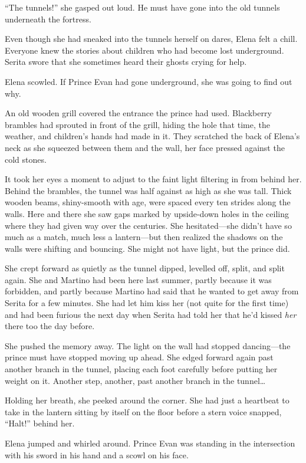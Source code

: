 \documentclass[10pt]{book}
\begin{document}
``The tunnels!'' she gasped out loud. He must have gone into the old tunnels underneath the fortress.

Even though she had sneaked into the tunnels herself on dares, Elena felt a chill. Everyone knew the stories about children who had become lost underground. Serita swore that she sometimes heard their ghosts crying for help.

Elena scowled. If Prince Evan had gone underground, she was going to find out why.

An old wooden grill covered the entrance the prince had used. Blackberry brambles had sprouted in front of the grill, hiding the hole that time, the weather, and children's hands had made in it. They scratched the back of Elena's neck as she squeezed between them and the wall, her face pressed against the cold stones.

It took her eyes a moment to adjust to the faint light filtering in from behind her.  Behind the brambles, the tunnel was half against as high as she was tall. Thick wooden beams, shiny-smooth with age, were spaced every ten strides along the walls.  Here and there she saw gaps marked by upside-down holes in the ceiling where they had given way over the centuries.  She hesitated---she didn't have so much as a match, much less a lantern---but then realized the shadows on the walls were shifting and bouncing.  She might not have light, but the prince did.

She crept forward as quietly as the tunnel dipped, levelled off, split, and split again.  She and Martino had been here last summer, partly because it was forbidden, and partly because Martino had said that he wanted to get away from Serita for a few minutes.  She had let him kiss her (not quite for the first time) and had been furious the next day when Serita had told her that he'd kissed \emph{her} there too the day before.

She pushed the memory away. The light on the wall had stopped dancing---the prince must have stopped moving up ahead. She edged forward again past another branch in the tunnel, placing each foot carefully before putting her weight on it. Another step, another, past another branch in the tunnel{\ldots}

Holding her breath, she peeked around the corner. She had just a heartbeat to take in the lantern sitting by itself on the floor before a stern voice snapped, ``Halt!'' behind her.

Elena jumped and whirled around. Prince Evan was standing in the intersection with his sword in his hand and a scowl on his face.
\end{document}
